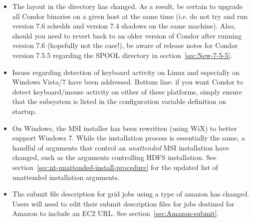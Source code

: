\begin{itemize}
\item The layout in the  directory has changed. As a result,
	be certain to upgrade all Condor binaries on a given host at the same time (i.e.
	do not try and run version 7.6 schedds and version 7.4 shadows on the same
	machine). Also, should you need to revert back to an older version of
	Condor after running version 7.6 (hopefully not the case!), be aware of
	release notes for Condor version 7.5.5 regarding the SPOOL directory in
	section~\ref{sec:New-7-5-5}.

\item Issues regarding detection of keyboard activity on Linux and
	especially on Windows Vista/7 have been addressed. Bottom line: if you
	want Condor to detect keyboard/mouse activity on either of these
	platforms, simply ensure that the subsystem  is listed in the
	 configuration variable definition on startup.


\item On Windows, the MSI installer has been rewritten (using WiX) to better
	support Windows 7. While the installation process is essentially the same,
	a handful of arguments that control an \emph{unattended} MSI installation
	have changed, such as the arguments controlling HDFS installation.  See
	section~\ref{sec:nt-unattended-install-procedure} for the updated list of
	unattended installation arguments.

\item The submit file description for grid jobs using a
	 type of amazon has changed. Users will need to
	edit their submit description files for jobs destined for Amazon to
	include an EC2 URL. See section~\ref{sec:Amazon-submit}.

\end{itemize}

